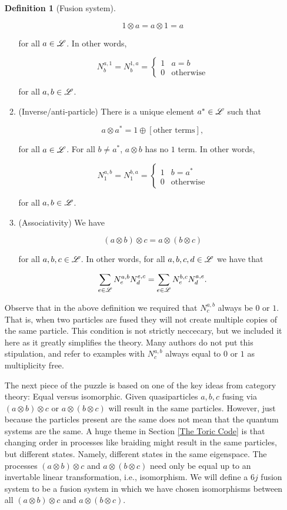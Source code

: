 \documentclass{article}
\theoremstyle{definition}
\newtheorem*{definition}{Definition}
\numberwithin{figure}{section}
\begin{document}
\begin{enumerate}[\thesection .1.]
\begin{definition}[Fusion system]
\begin{enumerate}
$$1\otimes a=a\otimes 1=a$$

for all $a\in \mathscr{L}$. In other words,

$$N^{a,1}_{b}=N^{1,a}_{b}=\begin{cases}1 & a=b \\ 0 & \text{otherwise}\end{cases}$$

for all $a,b\in \mathscr{L}$.

\item (Inverse/anti-particle) There is a unique element $a^*\in \mathscr{L}$ such that

$$a\otimes a^*=1\oplus [\text{other terms}],$$

for all $a\in \mathscr{L}$. For all  $b\neq a^*$, $a\otimes b$ has no $1$ term. In other words,

$$N^{a,b}_{1}=N^{b,a}_{1}=\begin{cases} 1 & b=a^* \\ 0 & \text{otherwise}\end{cases}$$

for all $a, b\in \mathscr{L}$.

\item (Associativity) We have

$$(a\otimes b)\otimes c=a\otimes (b\otimes c)$$

for all $a,b,c\in \mathscr{L}$. In other words, for all $a,b,c,d\in \mathscr{L}$ we have that

$$\sum_{e\in \mathscr{L}}N_e^{a,b}N_{d}^{e,c}=\sum_{e\in \mathscr{L}}N_{e}^{b,c}N_d^{a,e}.$$
\end{enumerate}

\raggedleft\qedsymbol{}
\end{definition}

Observe that in the above definition we required that $N_c^{a,b}$ always be $0$ or $1$. That is, when two particles are fused they will not create multiple copies of the same particle. This condition is not strictly neccecary, but we included it here as it greatly simplifies the theory. Many authors do not put this stipulation, and refer to examples with $N_c^{a,b}$ always equal to $0$ or $1$ as multiplicity free. 

The next piece of the puzzle is based on one of the key ideas from category theory: Equal versus isomorphic. Given quasiparticles $a,b,c$ fusing via $(a\otimes b)\otimes c$ or $a\otimes (b\otimes c)$ will result in the same particles. However, just because the particles present are the same does not mean that the quantum systems are the same. A huge theme in Section \ref{The Toric Code} is that changing order in processes like braiding might result in the same particles, but different states. Namely, different states in the same eigenspace. The processes $(a\otimes b)\otimes c$ and $a\otimes(b\otimes c)$ need only be equal up to an invertable linear transformation, i.e., isomorphism. We will define a $6j$ fusion system to be a fusion system in which we have chosen isomorphisms between all $(a\otimes b)\otimes c$ and $a\otimes (b\otimes c)$.


\end{enumerate}
\end{document}

